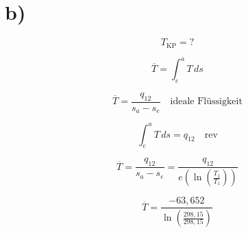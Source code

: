 

\section*{b)}

\[
T_{\text{KP}} = ?
\]

\[
\overline{T} = \int_{e}^{a} T \, ds
\]

\[
\overline{T} = \frac{q_{12}}{s_{a} - s_{e}} \quad \text{ideale Flüssigkeit}
\]

\[
\int_{e}^{a} T \, ds = q_{12} \quad \text{rev}
\]

\[
\overline{T} = \frac{q_{12}}{s_{a} - s_{e}} = \frac{q_{12}}{e \left( \ln \left( \frac{T_1}{T_1} \right) \right)}
\]

\[
\overline{T} = \frac{-63{,}652}{\ln \left( \frac{298{,}15}{298{,}15} \right)}
\]